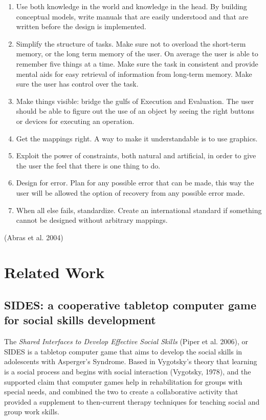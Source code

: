 \documentclass[runningheads]{llncs}
\begin{document}
\begin{enumerate}
    \item Use both knowledge in the world and knowledge in the head. By building conceptual models, write manuals that are easily understood and that are written before the design is implemented. 
    \item Simplify the structure of tasks. Make sure not to overload the short-term memory, or the long term memory of the user.  On average the user is able to remember five things at a time. Make sure the task in consistent and provide mental aids for easy retrieval of information from long-term memory. Make sure the user has control over the task. 
    \item Make things visible: bridge the gulfs of Execution and Evaluation. The user should be able to figure out the use of an object by seeing the right buttons or devices for executing an operation.  
    \item Get the mappings right. A way to make it understandable is to use graphics. 
    \item Exploit the power of constraints, both natural and artificial, in order to give the user the feel that there is one thing to do. 
    \item Design for error. Plan for any possible error that can be made, this way the user will be allowed the option of recovery from any possible error made. 
    \item When all else fails, standardize. Create an international standard if something cannot be designed without arbitrary mappings.
\end{enumerate}
\par (Abras et al. 2004)

\newpage
\section{Related Work}

\subsection{SIDES: a cooperative tabletop computer game for social skills development}

\par The \textit{Shared Interfaces to Develop Effective Social Skills} (Piper et al. 2006), or SIDES is a tabletop computer game that aims to develop the social skills in adolescents with Asperger's Syndrome.
Based in Vygotsky's theory that learning is a social process and begins with social interaction (Vygotsky, 1978), and the supported claim that computer games help in rehabilitation for groups with special needs, and combined the two to create a collaborative activity that provided a supplement to then-current therapy techniques for teaching social and group work skills.
\end{document}
